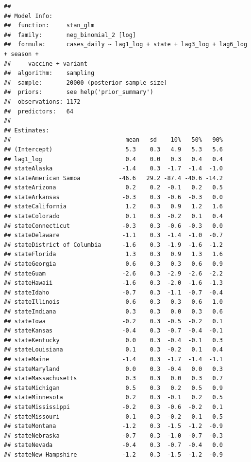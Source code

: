 \documentclass[
]{book}
\begin{document}
\begin{verbatim}
## 
## Model Info:
##  function:     stan_glm
##  family:       neg_binomial_2 [log]
##  formula:      cases_daily ~ lag1_log + state + lag3_log + lag6_log + season + 
##     vaccine + variant
##  algorithm:    sampling
##  sample:       20000 (posterior sample size)
##  priors:       see help('prior_summary')
##  observations: 1172
##  predictors:   64
## 
## Estimates:
##                                 mean   sd    10%   50%   90%
## (Intercept)                     5.3    0.3   4.9   5.3   5.6
## lag1_log                        0.4    0.0   0.3   0.4   0.4
## stateAlaska                    -1.4    0.3  -1.7  -1.4  -1.0
## stateAmerican Samoa           -46.6   29.2 -87.4 -40.6 -14.2
## stateArizona                    0.2    0.2  -0.1   0.2   0.5
## stateArkansas                  -0.3    0.3  -0.6  -0.3   0.0
## stateCalifornia                 1.2    0.3   0.9   1.2   1.6
## stateColorado                   0.1    0.3  -0.2   0.1   0.4
## stateConnecticut               -0.3    0.3  -0.6  -0.3   0.0
## stateDelaware                  -1.1    0.3  -1.4  -1.0  -0.7
## stateDistrict of Columbia      -1.6    0.3  -1.9  -1.6  -1.2
## stateFlorida                    1.3    0.3   0.9   1.3   1.6
## stateGeorgia                    0.6    0.3   0.3   0.6   0.9
## stateGuam                      -2.6    0.3  -2.9  -2.6  -2.2
## stateHawaii                    -1.6    0.3  -2.0  -1.6  -1.3
## stateIdaho                     -0.7    0.3  -1.1  -0.7  -0.4
## stateIllinois                   0.6    0.3   0.3   0.6   1.0
## stateIndiana                    0.3    0.3   0.0   0.3   0.6
## stateIowa                      -0.2    0.3  -0.5  -0.2   0.1
## stateKansas                    -0.4    0.3  -0.7  -0.4  -0.1
## stateKentucky                   0.0    0.3  -0.4  -0.1   0.3
## stateLouisiana                  0.1    0.3  -0.2   0.1   0.4
## stateMaine                     -1.4    0.3  -1.7  -1.4  -1.1
## stateMaryland                   0.0    0.3  -0.4   0.0   0.3
## stateMassachusetts              0.3    0.3   0.0   0.3   0.7
## stateMichigan                   0.5    0.3   0.2   0.5   0.9
## stateMinnesota                  0.2    0.3  -0.1   0.2   0.5
## stateMississippi               -0.2    0.3  -0.6  -0.2   0.1
## stateMissouri                   0.1    0.3  -0.2   0.1   0.5
## stateMontana                   -1.2    0.3  -1.5  -1.2  -0.9
## stateNebraska                  -0.7    0.3  -1.0  -0.7  -0.3
## stateNevada                    -0.4    0.3  -0.7  -0.4   0.0
## stateNew Hampshire             -1.2    0.3  -1.5  -1.2  -0.9

\end{verbatim}
\end{document}
